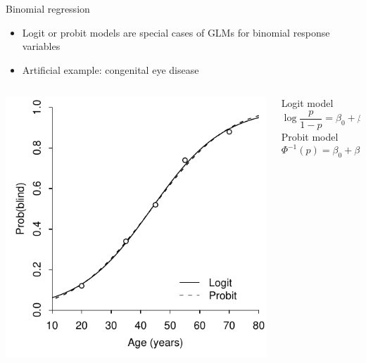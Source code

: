 \documentclass[aspectratio=169]{beamer}
\begin{document}
\begin{frame}{Binomial regression}
  \begin{itemize}
    \item Logit or probit models are special cases of GLMs for binomial
      response variables
    \item Artificial example: congenital eye disease
  \end{itemize}
\begin{columns}[c]
\begin{column}{6cm}
  \includegraphics[scale=.7]{../figures/glm}
\end{column}
\begin{column}{5cm}
Logit model
\[
  \log\frac{p}{1 - p} = \beta_0 + \beta_1 AGE
\]
Probit model
\[
  \Phi^{-1}(p) = \beta_0 + \beta_1 AGE
\]
\end{column}
\end{columns}
\end{frame}
\end{document}
